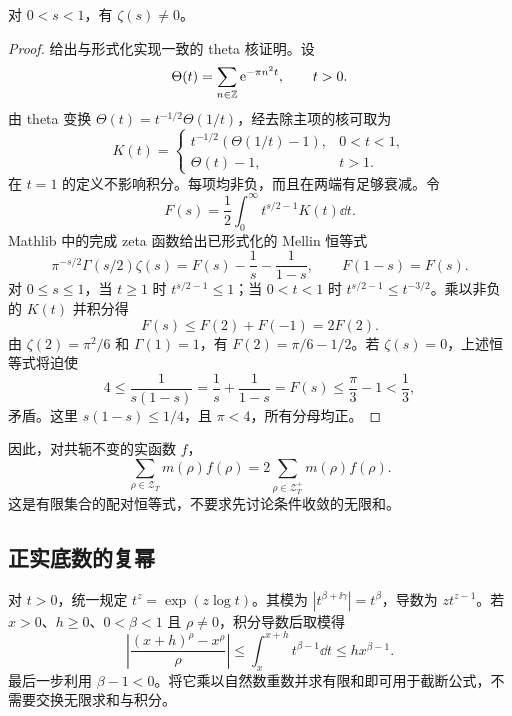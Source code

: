 \begin{lemma}[实轴无非平凡零点]\label{pre:real-axis}
对 $0<s<1$，有 $\zeta(s)\ne0$。
\end{lemma}
\begin{proof}
给出与形式化实现一致的 theta 核证明。设
\[
\Theta(t)=\sum_{n\in\mathbb Z}\mathrm e^{-\pi n^2t},\qquad t>0.
\]
由 theta 变换 $\Theta(t)=t^{-1/2}\Theta(1/t)$，经去除主项的核可取为
\[
K(t)=
\begin{cases}
t^{-1/2}(\Theta(1/t)-1),&0<t<1,\\
\Theta(t)-1,&t>1.
\end{cases}
\]
在 $t=1$ 的定义不影响积分。每项均非负，而且在两端有足够衰减。令
\[
F(s)=\frac12\int_0^\infty t^{s/2-1}K(t)\dd t.
\]
Mathlib 中的完成 zeta 函数给出已形式化的 Mellin 恒等式
\[
\pi^{-s/2}\Gamma(s/2)\zeta(s)
=F(s)-\frac1s-\frac1{1-s},\qquad F(1-s)=F(s).
\]
对 $0\le s\le1$，当 $t\ge1$ 时 $t^{s/2-1}\le1$；当 $0<t<1$ 时 $t^{s/2-1}\le t^{-3/2}$。乘以非负的 $K(t)$ 并积分得
\[
F(s)\le F(2)+F(-1)=2F(2).
\]
由 $\zeta(2)=\pi^2/6$ 和 $\Gamma(1)=1$，有 $F(2)=\pi/6-1/2$。若 $\zeta(s)=0$，上述恒等式将迫使
\[
4\le\frac1{s(1-s)}=\frac1s+\frac1{1-s}=F(s)
\le\frac\pi3-1<\frac13,
\]
矛盾。这里 $s(1-s)\le1/4$，且 $\pi<4$，所有分母均正。
\end{proof}

因此，对共轭不变的实函数 $f$，
\begin{equation}\label{eq:positive-pair}
\sum_{\rho\in\mathcal Z_T}m(\rho)f(\rho)
=2\sum_{\rho\in\mathcal Z_T^+}m(\rho)f(\rho).
\end{equation}
这是有限集合的配对恒等式，不要求先讨论条件收敛的无限和。

\subsection{正实底数的复幂}
对 $t>0$，统一规定 $t^z=\exp(z\log t)$。其模为 $|t^{\beta+\ii\gamma}|=t^\beta$，导数为 $zt^{z-1}$。若 $x>0$、$h\ge0$、$0<\beta<1$ 且 $\rho\ne0$，积分导数后取模得
\begin{equation}\label{eq:cpow-short}
\left|\frac{(x+h)^\rho-x^\rho}{\rho}\right|
\le\int_x^{x+h}t^{\beta-1}\dd t
\le h x^{\beta-1}.
\end{equation}
最后一步利用 $\beta-1<0$。将它乘以自然数重数并求有限和即可用于截断公式，不需要交换无限求和与积分。

